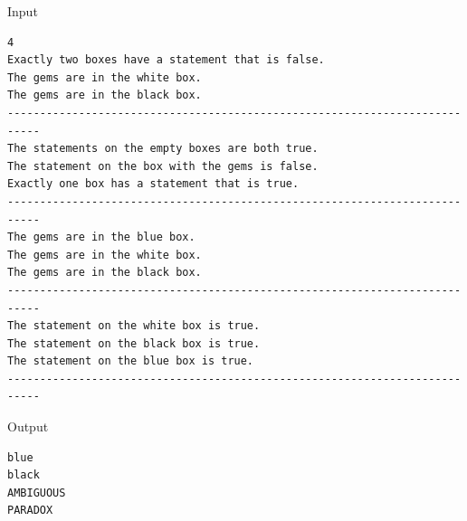 \begin{sampleIOblock}{Input}{}
\begin{verbatim}
4
Exactly two boxes have a statement that is false.
The gems are in the white box.
The gems are in the black box.
---------------------------------------------------------------------------
The statements on the empty boxes are both true.
The statement on the box with the gems is false.
Exactly one box has a statement that is true.
---------------------------------------------------------------------------
The gems are in the blue box.
The gems are in the white box.
The gems are in the black box.
---------------------------------------------------------------------------
The statement on the white box is true.
The statement on the black box is true.
The statement on the blue box is true.
---------------------------------------------------------------------------
\end{verbatim}
\end{sampleIOblock}

\begin{sampleIOblock}{Output}{}
\begin{verbatim}
blue
black
AMBIGUOUS
PARADOX
\end{verbatim}
\end{sampleIOblock}



